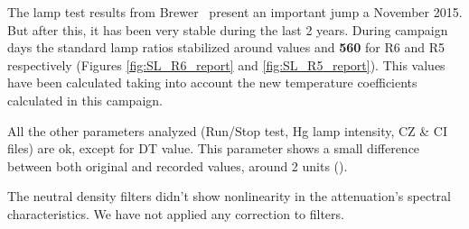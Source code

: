 The lamp test results from Brewer \brwname\ present an important jump a November 2015. But after this, it has been very stable during the last 2 years. During campaign days the standard lamp ratios stabilized around values \textbf{\slrefNEW} and \textbf{560} for R6 and R5 respectively (Figures \ref{fig:SL_R6_report} and \ref{fig:SL_R5_report}). This values have been calculated taking into account the new temperature coefficients calculated in this campaign. 



All the other parameters analyzed (Run/Stop test, Hg lamp intensity, CZ \& CI files) are ok, except for DT value. This parameter shows a small difference between both original and recorded values, around 2 units (). 




The neutral density filters didn't show nonlinearity in the attenuation's spectral characteristics. We have not applied any correction to filters.



